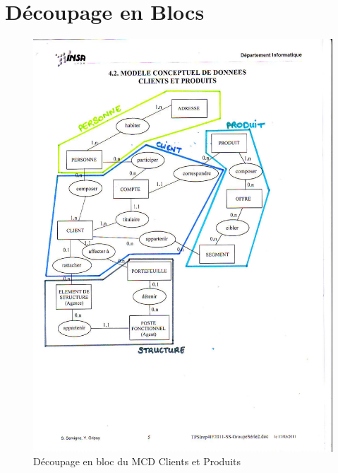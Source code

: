 \section{Découpage en Blocs}
\begin{figure}[H]
	\begin{center}
		\includegraphics[scale=0.4,clip, trim = 5mm 65mm 35mm 35mm]{Includes/SOA-Blocs-1.pdf}
		\caption{Découpage en bloc du MCD Clients et Produits}
	\end{center}
\end{figure}

